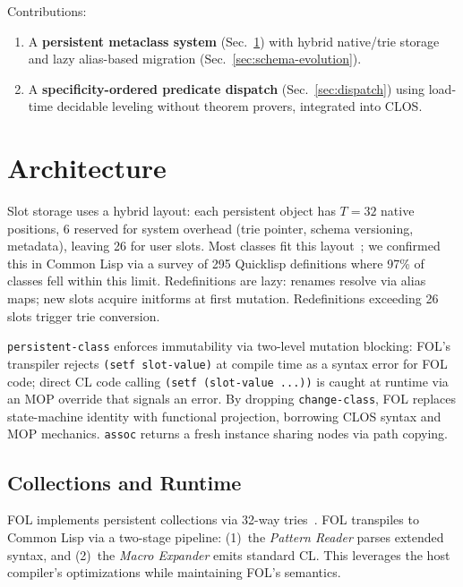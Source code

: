 \documentclass[sigconf,nonacm]{acmart}
\begin{document}
Contributions:
\begin{enumerate}
  \item A \textbf{persistent metaclass system} (Sec.~\ref{sec:architecture}) with hybrid native/trie storage and lazy alias-based migration (Sec.~\ref{sec:schema-evolution}).
  \item A \textbf{specificity-ordered predicate dispatch} (Sec.~\ref{sec:dispatch}) using load-time decidable leveling without theorem provers, integrated into CLOS.
\end{enumerate}

\section{Architecture}
\label{sec:architecture}

Slot storage uses a hybrid layout: each persistent object has $T=32$ native positions, 6 reserved for system overhead (trie pointer, schema versioning, metadata), leaving 26 for user slots.
Most classes fit this layout~\cite{Lanza2006}; we confirmed this in Common Lisp via a survey of 295 Quicklisp definitions where 97\% of classes fell within this limit.
Redefinitions are lazy: renames resolve via alias maps; new slots acquire initforms at first mutation.
Redefinitions exceeding 26 slots trigger trie conversion.

\texttt{persistent-class} enforces immutability via two-level mutation blocking: FOL's transpiler rejects \texttt{(setf slot-value)} at compile time as a syntax error for FOL code;
direct CL code calling \texttt{(setf (slot-value ...))} is caught at runtime via an MOP override that signals an error.
By dropping \texttt{change-class}, FOL replaces state-machine identity with functional projection, borrowing CLOS syntax and MOP mechanics.
\texttt{assoc} returns a fresh instance sharing nodes via path copying.

\subsection{Collections and Runtime}
FOL implements persistent collections via 32-way tries~\cite{Okasaki1998,Bagwell2000}.
FOL transpiles to Common Lisp via a two-stage pipeline: (1)~the \textit{Pattern Reader} parses extended syntax, and (2)~the \textit{Macro Expander} emits standard CL.
This leverages the host compiler's optimizations while maintaining FOL's semantics.
\end{document}
